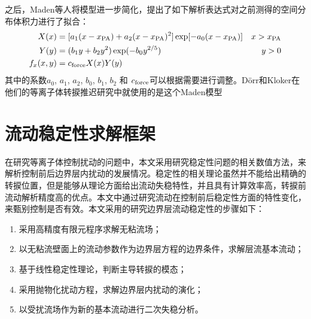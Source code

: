 之后，Maden等人\cite{Maden2013}将模型进一步简化，提出了如下解析表达式对之前测得的空间分布体积力进行了拟合：
\begin{subequations}\label{f:MadenModel}
\begin{align}
    X(x)&=[a_1(x-x_{\rm PA})+a_2(x-x_{\rm PA})^2]\exp[-a_0(x-x_{\rm PA})] &x>x_{\rm PA}\\
    Y(y)&=(b_1y+b_2y^2)\exp(-b_0y^{2/5}) &y>0\\
    f_x(x,y)&=c_{\rm force}X(x)Y(y)&
\end{align}
\end{subequations}
其中的系数$a_0$, $a_1$, $a_2$, $b_0$, $b_1$,  $b_2$ 和 $c_{\rm force}$可以根据需要进行调整。D\"orr和Kloker\cite{dorr2016,dorr2015stabilisation}在他们的等离子体转捩推迟研究中就使用的是这个Maden模型
\section{流动稳定性求解框架}
在研究等离子体控制扰动的问题中，本文采用研究稳定性问题的相关数值方法，来解析控制前后边界层内扰动的发展情况。稳定性的相关理论虽然并不能给出精确的转捩位置，但是能够从理论方面给出流动失稳特性，并且具有计算效率高，转捩前流动解析精度高的优点。本文中通过研究流动在控制前后稳定性方面的特性变化，来甄别控制是否有效。本文采用的研究边界层流动稳定性的步骤如下：
\begin{enumerate}
  \item 采用高精度有限元程序求解无粘流场；
  \item 以无粘流壁面上的流动参数作为边界层方程的边界条件，求解层流基本流动；
  \item 基于线性稳定性理论，判断主导转捩的模态；
  \item 采用抛物化扰动方程，求解边界层内扰动的演化；
  \item 以受扰流场作为新的基本流动进行二次失稳分析。
\end{enumerate}

